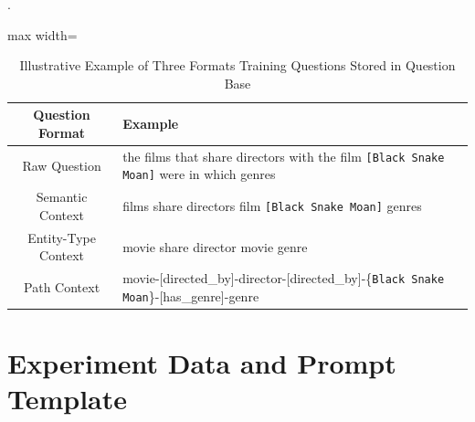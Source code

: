 \documentclass[sigconf]{acmart}
\begin{document}

\begin{table}[t]
\centering
\caption{Illustrative Example of Three Formats Training Questions Stored in Question Base}.
  \begin{adjustbox}{max width=\textwidth}
    \begin{tabular}{c|l}
      \toprule
      \textbf{Question Format} & \textbf{Example} \\ \midrule\midrule
      Raw Question &
        the films that share directors with the film \texttt{[Black Snake Moan]} were in which genres \\ \midrule
      Semantic Context &
        films share directors film \texttt{[Black Snake Moan]} genres \\ \midrule
      Entity-Type Context &
        movie share director movie genre \\ \midrule
      Path Context &
        movie-[directed\_by]-director-[directed\_by]-\{\texttt{Black Snake Moan}\}-[has\_genre]-genre \\
      \bottomrule
    \end{tabular}
    \label{table:exampleQue}
  \end{adjustbox}
\end{table}

\section{Experiment Data and Prompt Template}\label{app:example}
\end{document}
